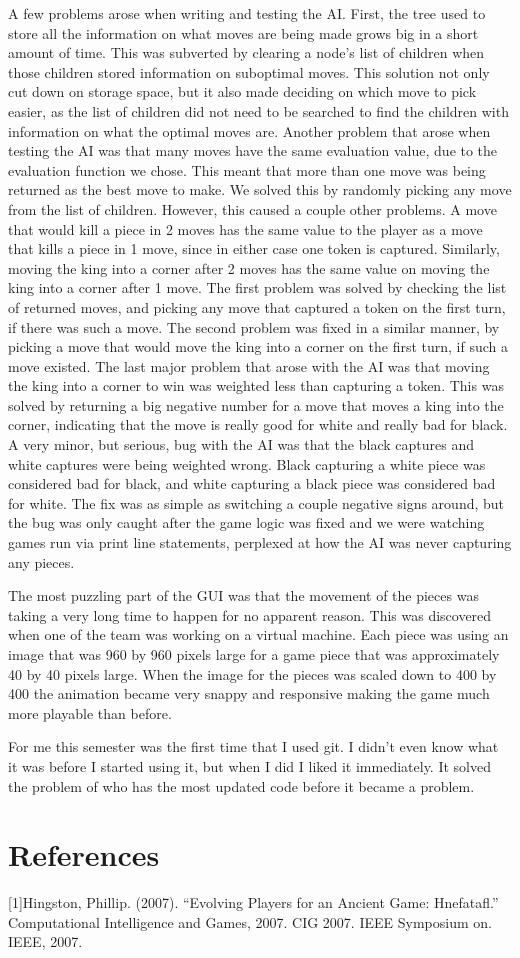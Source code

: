 \documentclass{article}
\begin{document}
	A few problems arose when writing and testing the AI. First, the tree used to store all the information on what moves are being made grows big in a short amount of time. This was subverted by clearing a node's list of children when those children stored information on suboptimal moves. This solution not only cut down on storage space, but it also made deciding on which move to pick easier, as the list of children did not need to be searched to find the children with information on what the optimal moves are. Another problem that arose when testing the AI was that many moves have the same evaluation value, due to the evaluation function we chose. This meant that more than one move was being returned as the best move to make. We solved this by randomly picking any move from the list of children. However, this caused a couple other problems. A move that would kill a piece in 2 moves has the same value to the player as a move that kills a piece in 1 move, since in either case one token is captured. Similarly, moving the king into a corner after 2 moves has the same value on moving the king into a corner after 1 move. The first problem was solved by checking the list of returned moves, and picking any move that captured a token on the first turn, if there was such a move. The second problem was fixed in a similar manner, by picking a move that would move the king into a corner on the first turn, if such a move existed. The last major problem that arose with the AI was that moving the king into a corner to win was weighted less than capturing a token. This was solved by returning a big negative number for a move that moves a king into the corner, indicating that the move is really good for white and really bad for black. A very minor, but serious, bug with the AI was that the black captures and white captures were being weighted wrong. Black capturing a white piece was considered bad for black, and white capturing a black piece was considered bad for white. The fix was as simple as switching a couple negative signs around, but the bug was only caught after the game logic was fixed and we were watching games run via print line statements, perplexed at how the AI was never capturing any pieces.\par
	The most puzzling part of the GUI was that the movement of the pieces was taking a very long time to happen for no apparent reason. This was discovered when one of the team was working on a virtual machine. Each piece was using an image that was 960 by 960 pixels large for a game piece that was approximately 40 by 40 pixels large. When the image for the pieces was scaled down to 400 by 400 the animation became very snappy and responsive making the game much more playable than before. \par
	For me this semester was the first time that I used git. I didn't even know what it was before I started using it, but when I did I liked it immediately. It solved the problem of who has the most updated code before it became a problem. 

\section{References}
[1]Hingston, Phillip. (2007). “Evolving Players for an Ancient Game: Hnefatafl.” Computational Intelligence and Games, 2007. CIG 2007. IEEE Symposium on. IEEE, 2007.
\end{document}
